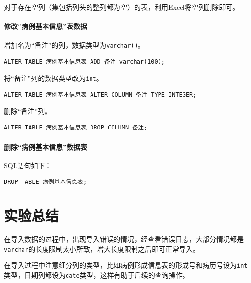 \documentclass[lang=cn,11pt,a4paper,cite=authornum]{paper}
\begin{document}
对于存在空列（集包括列头的整列都为空）的表，利用Excel将空列删除即可。

\paragraph{修改“病例基本信息”表数据}

增加名为“备注”的列，数据类型为\texttt{varchar()}。

\begin{code}
\begin{verbatim}
ALTER TABLE 病例基本信息表 ADD 备注 varchar(100);
\end{verbatim}
\end{code}

将“备注”列的数据类型改为\texttt{int}。

\begin{code}
\begin{verbatim}
ALTER TABLE 病例基本信息表 ALTER COLUMN 备注 TYPE INTEGER;
\end{verbatim}
\end{code}

删除“备注”列。

\begin{code}
\begin{verbatim}
ALTER TABLE 病例基本信息表 DROP COLUMN 备注;
\end{verbatim}
\end{code}

\paragraph{删除“病例基本信息”数据表} SQL语句如下：

\begin{code}
\begin{verbatim}
DROP TABLE 病例基本信息表;
\end{verbatim}
\end{code}

\section{实验总结}

在导入数据的过程中，出现导入错误的情况，经查看错误日志，大部分情况都是\texttt{varchar}的长度限制太小所致，增大长度限制之后即可正常导入。

在导入过程中注意细分列的类型，比如病例形成信息表的形成号和病历号设为\texttt{int}类型，日期列都设为\texttt{date}类型，这样有助于后续的查询操作。
\end{document}
